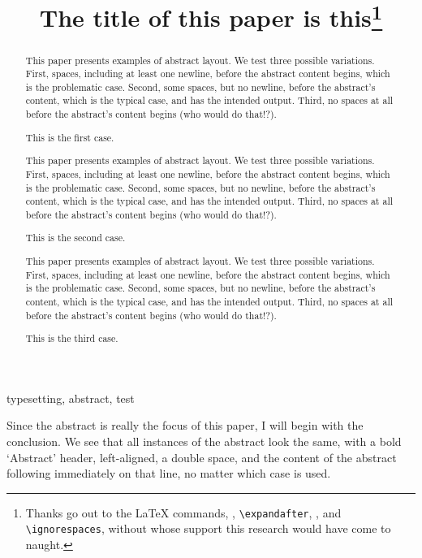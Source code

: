 \documentclass[lucida]{sp}
\title[The title of this paper]{The title of this paper is this\thanks{Thanks go out to the \LaTeX{} commands, \texttt{\textbackslash@ifnextchar}, \texttt{\textbackslash{}expandafter}, \texttt{\textbackslash@gobble}, and \texttt{\textbackslash{}ignorespaces}, without whose support this research would have come to naught.}}
\author[Semprag Typesetting]{%
  \spauthor{Semprag Typesetting \\ \institute{Semantics \& Pragmatics}}
}
\begin{document}
\maketitle

\begin{abstract}

This paper presents examples of abstract layout. We test three possible variations. First, spaces, including at least one newline, before the abstract content begins, which is the problematic case. Second, some spaces, but no newline, before the abstract's content, which is the typical case, and has the intended output. Third, no spaces at all before the abstract's content begins (who would do that!?).

This is the first case.

\end{abstract}

\begin{abstract}
This paper presents examples of abstract layout. We test three possible variations. First, spaces, including at least one newline, before the abstract content begins, which is the problematic case. Second, some spaces, but no newline, before the abstract's content, which is the typical case, and has the intended output. Third, no spaces at all before the abstract's content begins (who would do that!?).

This is the second case.
\end{abstract}

\begin{abstract}This paper presents examples of abstract layout. We test three possible variations. First, spaces, including at least one newline, before the abstract content begins, which is the problematic case. Second, some spaces, but no newline, before the abstract's content, which is the typical case, and has the intended output. Third, no spaces at all before the abstract's content begins (who would do that!?).

This is the third case.
\end{abstract}

\begin{keywords}
typesetting, abstract, test
\end{keywords}

Since the abstract is really the focus of this paper, I will begin with the conclusion. We see that all instances of the abstract look the same, with a bold `Abstract' header, left-aligned, a double space, and the content of the abstract following immediately on that line, no matter which case is used.
\end{document}
